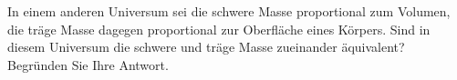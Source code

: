 In einem anderen Universum sei die schwere Masse proportional zum Volumen, die träge Masse dagegen proportional zur Oberfläche eines Körpers. Sind in diesem Universum die schwere und träge Masse zueinander äquivalent? Begründen Sie Ihre Antwort.
